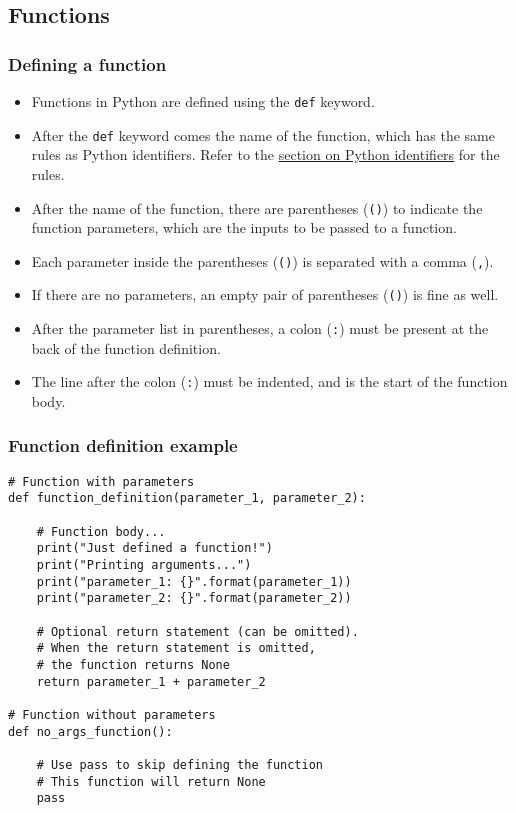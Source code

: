 \documentclass[11pt]{article}
\begin{document}
\subsection{Functions}
\label{sec:orgc5a411c}

\subsubsection{Defining a function}
\label{sec:org3ef9053}
\begin{itemize}
\item Functions in Python are defined using the \texttt{def} keyword.
\item After the \texttt{def} keyword comes the name of the function, which has the same rules as Python identifiers. Refer to the \hyperref[org72b2d39]{section on Python identifiers} for the rules.
\item After the name of the function, there are parentheses (\texttt{()}) to indicate the function parameters, which are the inputs to be passed to a function.
\item Each parameter inside the parentheses (\texttt{()}) is separated with a comma (\texttt{,}).
\item If there are no parameters, an empty pair of parentheses (\texttt{()}) is fine as well.
\item After the parameter list in parentheses, a colon (\texttt{:}) must be present at the back of the function definition.
\item The line after the colon (\texttt{:}) must be indented, and is the start of the function body.
\end{itemize}

\subsubsection{Function definition example}
\label{sec:org9a65db8}
\begin{verbatim}
# Function with parameters
def function_definition(parameter_1, parameter_2):

    # Function body...
    print("Just defined a function!")
    print("Printing arguments...")
    print("parameter_1: {}".format(parameter_1))
    print("parameter_2: {}".format(parameter_2))

    # Optional return statement (can be omitted).
    # When the return statement is omitted,
    # the function returns None
    return parameter_1 + parameter_2

# Function without parameters
def no_args_function():

    # Use pass to skip defining the function
    # This function will return None
    pass
\end{verbatim}
\end{document}
